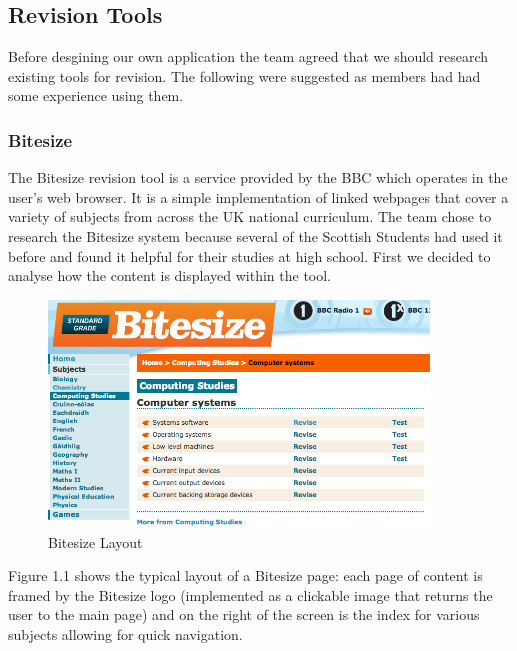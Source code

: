 \documentclass{l3proj}
\begin{document}
\subsection{Revision Tools}

Before desgining our own application the team agreed that we should
research existing tools for revision. The following were suggested as
members had had some experience using them. 

\subsubsection{Bitesize}
The Bitesize revision tool is a service provided by the BBC which
operates in the user's web browser. It is a simple implementation of
linked webpages that cover a variety of subjects from across the UK
national curriculum. The team chose to research the Bitesize system
because several of the Scottish Students had used it before and found
it helpful for their studies at high school. First we decided to analyse how the
content is displayed within the tool.\\

\begin{figure}[!htb]
\caption{Bitesize Layout}
 \centering
\includegraphics[width=0.9\textwidth]{images/Bitesize/BitesizeLayout.png}
\end{figure}

Figure 1.1 shows the typical layout of a Bitesize page: each page of
content is framed by the Bitesize logo (implemented as a clickable image that
returns the user to the main page) and on the right of the screen is
the index for various subjects allowing for quick navigation.\\
\end{document}
